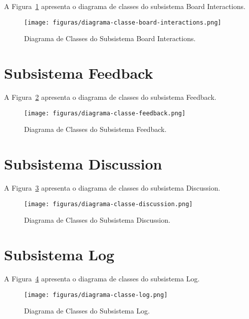 A Figura~\ref{figura-board-interactions-classe} apresenta o diagrama de classes do subsistema Board Interactions.

\begin{figure}[h]
	\centering
	\texttt{[image: figuras/diagrama-classe-board-interactions.png]}
	\caption{Diagrama de Classes do Subsistema Board Interactions.}
	\label{figura-board-interactions-classe}
\end{figure} 
\newpage

\section{Subsistema Feedback}


A Figura~\ref{figura-feedback-classe} apresenta o diagrama de classes do subsistema Feedback.

\begin{figure}[h]
	\centering
	\texttt{[image: figuras/diagrama-classe-feedback.png]}
	\caption{Diagrama de Classes do Subsistema Feedback.}
	\label{figura-feedback-classe}
\end{figure} 
\newpage

\section{Subsistema Discussion}


A Figura~\ref{figura-discussion-classe} apresenta o diagrama de classes do subsistema Discussion.

\begin{figure}[h]
	\centering
	\texttt{[image: figuras/diagrama-classe-discussion.png]}
	\caption{Diagrama de Classes do Subsistema Discussion.}
	\label{figura-discussion-classe}
\end{figure} 
\newpage

\section{Subsistema Log}


A Figura~\ref{figura-log-classe} apresenta o diagrama de classes do subsistema Log.

\begin{figure}[h]
	\centering
	\texttt{[image: figuras/diagrama-classe-log.png]}
	\caption{Diagrama de Classes do Subsistema Log.}
	\label{figura-log-classe}
\end{figure} 

\newpage




\newpage